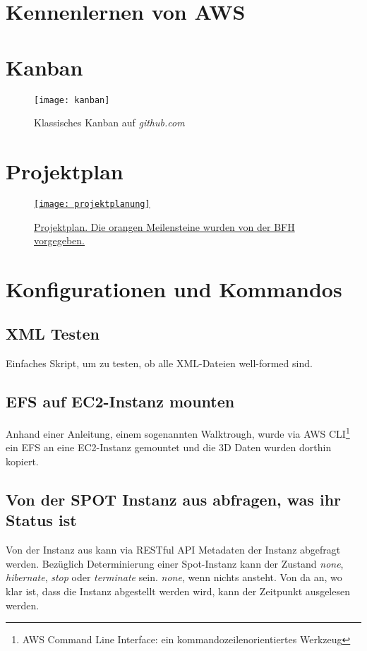 \section{Kennenlernen von AWS}
\section{Kanban}\label{appendix:kanban}
\begin{figure}[H]
	\centering
	\texttt{[image: kanban]}
	\caption{Klassisches Kanban auf \emph{github.com}}
	\label{fig:Klassisches Kanban}
\end{figure}

\section{Projektplan}\label{appendix:projektplan}
\begin{figure}[H]
	\centering
	\href{https://docs.google.com/spreadsheets/d/1zKTZgt4BW736G0xRfU9o3vWYwAJj-8nzFvGsPR7yJ_0/edit?usp=sharing}{
	\texttt{[image: projektplanung]}}
	\caption{\href{https://docs.google.com/spreadsheets/d/1zKTZgt4BW736G0xRfU9o3vWYwAJj-8nzFvGsPR7yJ_0/edit?usp=sharing}{Projektplan. Die orangen Meilensteine wurden von der BFH vorgegeben.}}
	\label{fig:Projektplan}
\end{figure}

\section{Konfigurationen und Kommandos}
\subsection{XML Testen}
Einfaches Skript, um zu testen, ob alle XML-Dateien well-formed sind.

\subsection{EFS auf EC2-Instanz mounten}
Anhand einer Anleitung, einem sogenannten Walktrough, wurde via AWS CLI\footnote{AWS Command Line Interface: ein kommandozeilenorientiertes Werkzeug} ein
EFS an eine EC2-Instanz gemountet und die 3D Daten wurden dorthin kopiert.

\subsection{Von der SPOT Instanz aus abfragen, was ihr Status ist}\label{appendix:restful}
Von der Instanz aus kann via RESTful API Metadaten der Instanz abgefragt werden. Bezüglich Determinierung einer Spot-Instanz kann der Zustand \emph{none}, \emph{hibernate}, \emph{stop} oder \emph{terminate} sein. \emph{none}, wenn nichts ansteht. Von da an, wo klar ist, dass die Instanz abgestellt werden wird, kann der Zeitpunkt ausgelesen werden.

